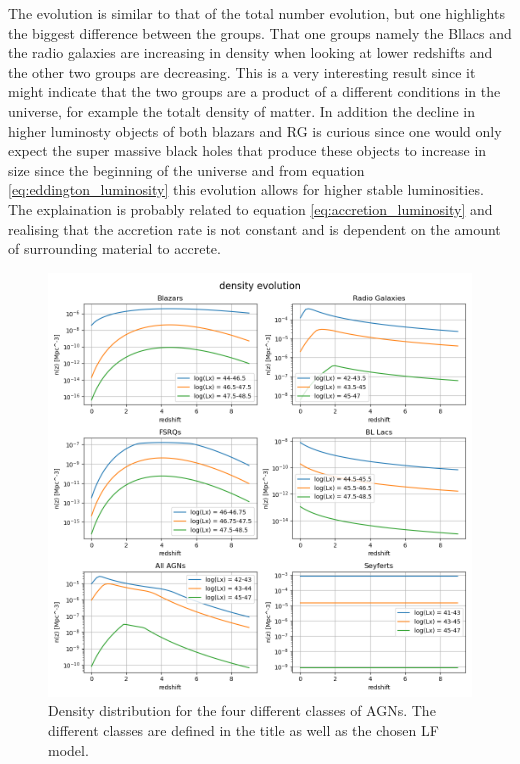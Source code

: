 \documentclass{article}
\begin{document}
The evolution is similar to that of the total number evolution, but one highlights the biggest difference between the groups. That one groups namely the Bllacs and the radio galaxies
are increasing in density when looking at lower redshifts and the other two groups are decreasing. This is a very interesting result since it might indicate that the two groups are 
a product of a different conditions in the universe, for example the totalt density of matter. In addition the decline in higher luminosty objects of both blazars and RG is curious since one would only expect the 
super massive black holes that produce these objects to increase in size since the beginning of the universe and from equation \ref{eq:eddington_luminosity} this evolution allows for higher stable luminosities. The explaination is probably related to equation \ref{eq:accretion_luminosity} 
and realising that the accretion rate is not constant and is dependent on the amount of surrounding material to accrete.  



\begin{figure}
    \centering
    \includegraphics[width = \textwidth]{new_plots/Redshift density evolution.png}
    \caption{Density distribution for the four different classes of AGNs. The different classes are defined in the title as well as the chosen LF model.}
    \label{fig:DD}
\end{figure}
\end{document}
